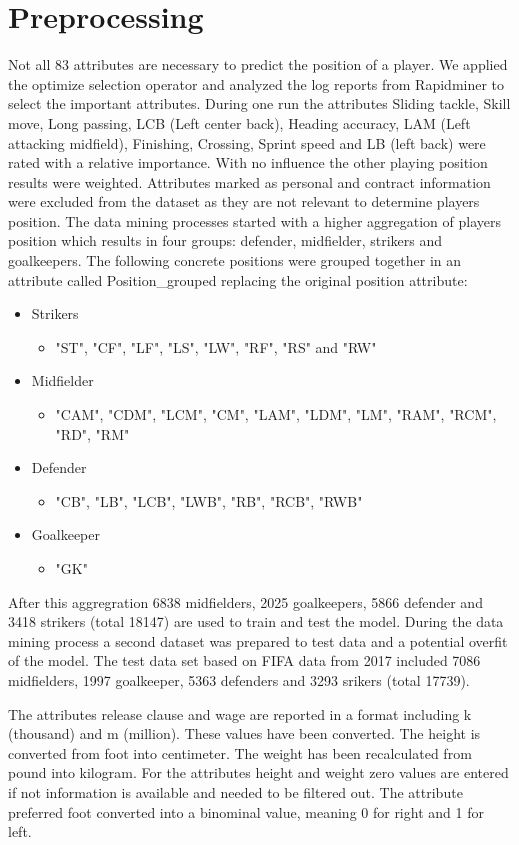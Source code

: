 \section{Preprocessing}

Not all 83 attributes are necessary to predict the position of a player.
We applied the optimize selection operator and analyzed the log reports from Rapidminer to select the important attributes.
During one run the attributes Sliding tackle, Skill move, Long passing, LCB (Left center back), Heading accuracy, LAM (Left attacking midfield), Finishing, Crossing, Sprint speed and LB (left back) were rated with a relative importance. With no influence the other playing position results were weighted. \newline
Attributes marked as personal and contract information were excluded from the dataset as they are not relevant to determine players position. 
The data mining processes started with a higher aggregation of players position which results in four groups: defender, midfielder, strikers and goalkeepers. The following concrete positions were grouped together in an attribute called Position\_grouped replacing the original position attribute:
\begin{itemize} 
\item Strikers
\begin{itemize}
\item "ST", "CF", "LF", "LS", "LW", "RF", "RS" and "RW"
\end{itemize}
\item Midfielder
\begin{itemize}
\item "CAM", "CDM", "LCM", "CM", "LAM", "LDM", "LM", "RAM", "RCM", "RD", "RM"
\end{itemize}
\item Defender
\begin{itemize} 
\item "CB", "LB", "LCB", "LWB", "RB", "RCB", "RWB"
\end{itemize}
\item Goalkeeper
\begin{itemize}
\item "GK"
\end{itemize}
\end{itemize}

After this aggregration 6838 midfielders, 2025 goalkeepers, 5866 defender and 3418 strikers (total 18147) are used to train and test the model.
During the data mining process a second dataset was prepared to test data and a potential overfit of the model. The test data set based on FIFA data from 2017 included 7086 midfielders, 1997 goalkeeper, 5363 defenders and 3293 srikers (total 17739).

The attributes release clause and wage are reported in a format including k (thousand) and m (million). These values have been converted. The height is converted from foot into centimeter. The weight has been recalculated from pound into kilogram.  For the attributes height and weight zero values are entered if not information is available and needed to be filtered out. The attribute preferred foot converted into a binominal value, meaning 0 for right and 1 for left.
